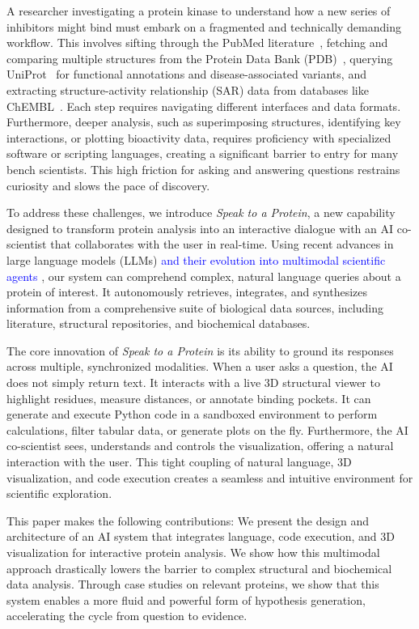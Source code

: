 \documentclass{article}
\newcommand{\new}[1]{\textcolor{blue}{#1}}
\newcommand{\new}[1]{#1}
\begin{document}
A researcher investigating a protein kinase to understand how a new series of inhibitors might bind must embark on a fragmented and technically demanding workflow. This involves sifting through the PubMed literature~\citep{Sayers2020}, fetching and comparing multiple structures from the Protein Data Bank (PDB)~\citep{Burley2018}, querying UniProt~\citep{UniProt2022}  for functional annotations and disease-associated variants, and extracting structure-activity relationship (SAR) data from databases like ChEMBL~\citep{Mendez2018}. Each step requires navigating different interfaces and data formats. Furthermore, deeper analysis, such as superimposing structures, identifying key interactions, or plotting bioactivity data, requires proficiency with specialized software or scripting languages, creating a significant barrier to entry for many bench scientists. This high friction for asking and answering questions restrains curiosity and slows the pace of discovery.

To address these challenges, we introduce \emph{Speak to a Protein}, a new capability 
designed to transform protein analysis into an interactive dialogue with an AI co-scientist that collaborates with the user in real-time. Using recent advances in large language models (LLMs) \new{and their evolution into multimodal scientific agents \citep{Caffagni2024, Zhang2024, Wang2024}}, our system can comprehend complex, natural language queries about a protein of interest. It autonomously retrieves, integrates, and synthesizes information from a comprehensive suite of biological data sources, including literature, structural repositories, and biochemical databases.

The core innovation of \emph{Speak to a Protein} is its ability to ground its responses across multiple, synchronized modalities. When a user asks a question, the AI does not simply return text. It interacts with a live 3D structural viewer to highlight residues, measure distances, or annotate binding pockets. It can generate and execute Python code in a sandboxed environment to perform calculations, filter tabular data, or generate plots on the fly. Furthermore, the AI co-scientist sees, understands and controls the visualization, offering a natural interaction with the user. This tight coupling of natural language, 3D visualization, and code execution creates a seamless and intuitive environment for scientific exploration. 

This paper makes the following contributions: We present the design and architecture of an AI system that integrates language, code execution, and 3D visualization for interactive protein analysis. We show how this multimodal approach drastically lowers the barrier to complex structural and biochemical data analysis. Through case studies on relevant proteins, we show that this system enables a more fluid and powerful form of hypothesis generation, accelerating the cycle from question to evidence.
\end{document}

